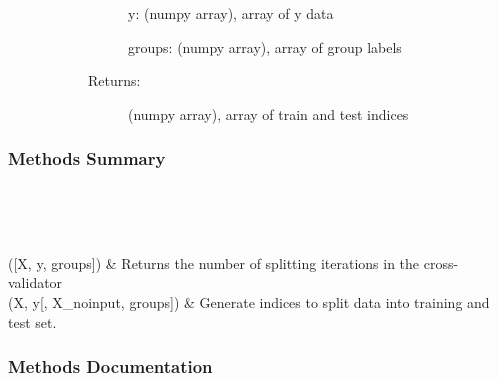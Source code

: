\documentclass[letterpaper,10pt,english]{sphinxmanual}
\begin{document}
\begin{fulllineitems}
\begin{description}
\begin{description}
\begin{description}
y: (numpy array), array of y data

groups: (numpy array), array of group labels

\item[{Returns:}] \leavevmode
(numpy array), array of train and test indices

\end{description}

\end{description}

\end{description}
\subsubsection*{Methods Summary}


\begin{savenotes}\sphinxatlongtablestart\begin{longtable}[c]{}
\hline

\endfirsthead

%
{}\\
\hline

\endhead

\hline
{}\\
\endfoot

\endlastfoot

{\hyperref[\detokenize{api/mastml.data_splitters.LeaveOutTwinCV:mastml.data_splitters.LeaveOutTwinCV.get_n_splits}]{}}({[}X, y, groups{]})
&
Returns the number of splitting iterations in the cross-validator
\\
\hline
{\hyperref[\detokenize{api/mastml.data_splitters.LeaveOutTwinCV:mastml.data_splitters.LeaveOutTwinCV.split}]{}}(X, y{[}, X\_noinput, groups{]})
&
Generate indices to split data into training and test set.
\\
\hline
\end{longtable}\sphinxatlongtableend\end{savenotes}
\subsubsection*{Methods Documentation}


\end{fulllineitems}
\end{document}
